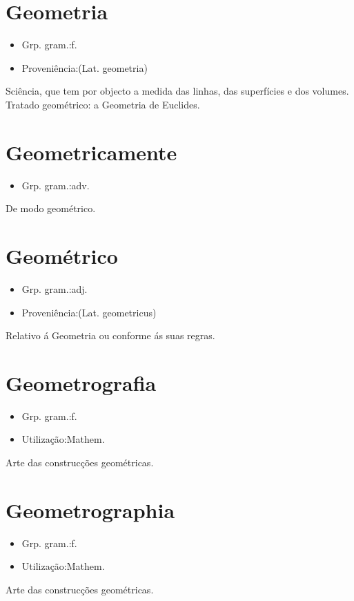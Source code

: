 \section{Geometria}
\begin{itemize}
\item {Grp. gram.:f.}
\end{itemize}
\begin{itemize}
\item {Proveniência:(Lat. \textunderscore geometria\textunderscore )}
\end{itemize}
Sciência, que tem por objecto a medida das linhas, das superfícies e dos volumes.
Tratado geométrico: \textunderscore a Geometria de Euclides\textunderscore .
\section{Geometricamente}
\begin{itemize}
\item {Grp. gram.:adv.}
\end{itemize}
De modo geométrico.
\section{Geométrico}
\begin{itemize}
\item {Grp. gram.:adj.}
\end{itemize}
\begin{itemize}
\item {Proveniência:(Lat. \textunderscore geometricus\textunderscore )}
\end{itemize}
Relativo á Geometria ou conforme ás suas regras.
\section{Geometrografia}
\begin{itemize}
\item {Grp. gram.:f.}
\end{itemize}
\begin{itemize}
\item {Utilização:Mathem.}
\end{itemize}
Arte das construcções geométricas.
\section{Geometrographia}
\begin{itemize}
\item {Grp. gram.:f.}
\end{itemize}
\begin{itemize}
\item {Utilização:Mathem.}
\end{itemize}
Arte das construcções geométricas.
